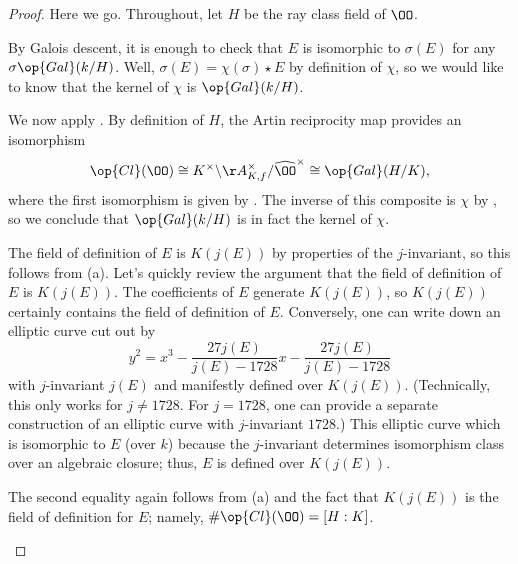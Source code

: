 \documentclass[../notes.tex]{subfiles}
\begin{document}
\begin{proof}
	Here we go. Throughout, let $H$ be the ray class field of $\OO$.
	\begin{listalph}
		\item By Galois descent, it is enough to check that $E$ is isomorphic to $\sigma(E)$ for any $\sigma\op{Gal}(k/H)$. Well, $\sigma(E)=\chi(\sigma)\star E$ by definition of $\chi$, so we would like to know that the kernel of $\chi$ is $\op{Gal}(k/H)$.
		
		We now apply . By definition of $H$, the Artin reciprocity map provides an isomorphism
		\[\op{Cl}(\OO)\cong K^\times\backslash\AA^\times_{K,f}/\widehat\OO^\times\cong\op{Gal}(H/K),\]
		where the first isomorphism is given by . The inverse of this composite is $\chi$ by , so we conclude that $\op{Gal}(k/H)$ is in fact the kernel of $\chi$.

		\item The field of definition of $E$ is $K(j(E))$ by properties of the $j$-invariant, so this follows from (a). Let's quickly review the argument that the field of definition of $E$ is $K(j(E))$. The coefficients of $E$ generate $K(j(E))$, so $K(j(E))$ certainly contains the field of definition of $E$. Conversely, one can write down an elliptic curve cut out by
		\[y^2=x^3-\frac{27j(E)}{j(E)-1728}x-\frac{27j(E)}{j(E)-1728}\]
		with $j$-invariant $j(E)$ and manifestly defined over $K(j(E))$. (Technically, this only works for $j\ne1728$. For $j=1728$, one can provide a separate construction of an elliptic curve with $j$-invariant $1728$.) This elliptic curve which is isomorphic to $E$ (over $k$) because the $j$-invariant determines isomorphism class over an algebraic closure; thus, $E$ is defined over $K(j(E))$.
		
		\item The second equality again follows from (a) and the fact that $K(j(E))$ is the field of definition for $E$; namely, $\#\op{Cl}(\OO)=[H:K]$.
		

\end{listalph}
\end{proof}
\end{document}

